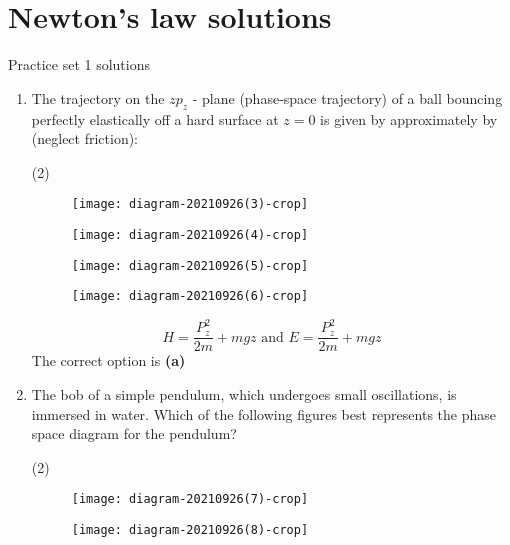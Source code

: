 \chapter{Newton's law solutions}
\begin{abox}
	Practice set 1 solutions
	\end{abox}
\begin{enumerate}
	\item The trajectory on the $z p_{z}$ - plane (phase-space trajectory) of a ball bouncing perfectly elastically off a hard surface at $z=0$ is given by approximately by (neglect friction):
	{}
\begin{tasks}(2)
	\task[\textbf{A.}]\begin{figure}[H]
		\centering
		\texttt{[image: diagram-20210926(3)-crop]}
	\end{figure}
	\task[\textbf{B.}]\begin{figure}[H]
		\centering
		\texttt{[image: diagram-20210926(4)-crop]}
	\end{figure}
	\task[\textbf{C.}]\begin{figure}[H]
		\centering
		\texttt{[image: diagram-20210926(5)-crop]}
	\end{figure}
	\task[\textbf{D.}]\begin{figure}[H]
		\centering
		\texttt{[image: diagram-20210926(6)-crop]}
	\end{figure}
\end{tasks}
\begin{answer}
	$$H=\frac{P_{z}^{2}}{2 m}+m g z \text { and } E=\frac{P_{z}^{2}}{2 m}+m g z$$
	The correct option is \textbf{(a)}
\end{answer}
	\item The bob of a simple pendulum, which undergoes small oscillations, is immersed in water. Which of the following figures best represents the phase space diagram for the pendulum?
	{}
\begin{tasks}(2)
	\task[\textbf{A.}]\begin{figure}[H]
		\centering
		\texttt{[image: diagram-20210926(7)-crop]}
	\end{figure}
	\task[\textbf{B.}]\begin{figure}[H]
		\centering
		\texttt{[image: diagram-20210926(8)-crop]}
	\end{figure}
	\task[\textbf{C.}]\begin{figure}[H]

\end{figure}
\end{tasks}
\end{enumerate}
